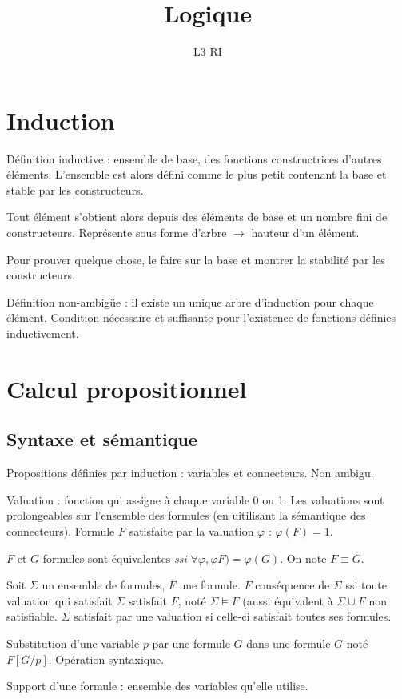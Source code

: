 \documentclass[french]{article}
\title{Logique}
\date{}
\author{L3 RI}
\begin{document}
\maketitle
\tableofcontents
\section{Induction}
Définition inductive : ensemble de base, des fonctions constructrices d'autres éléments. L'ensemble est alors défini comme le plus petit contenant la base et stable par les constructeurs.

Tout élément s'obtient alors depuis des éléments de base et un nombre fini de constructeurs. Représente sous forme d'arbre $\rightarrow$ hauteur d'un élément.

Pour prouver quelque chose, le faire sur la base et montrer la stabilité par les constructeurs.

Définition non-ambigüe : il existe un unique arbre d'induction pour chaque élément. Condition nécessaire et suffisante pour l'existence de fonctions définies inductivement.

\section{Calcul propositionnel}
\subsection{Syntaxe et sémantique}
Propositions définies par induction : variables et connecteurs. Non ambigu.

Valuation : fonction qui assigne à chaque variable 0 ou 1.
Les valuations sont prolongeables sur l'ensemble des formules (en uitilisant la sémantique des connecteurs). Formule $F$ satisfaite par la valuation $\varphi$ : $\varphi (F) = 1$.

$F$ et $G$ formules sont équivalentes \emph{ssi} $\forall\varphi ,\varphi F) = \varphi (G)$. On note $F\equiv G$. 

Soit $\Sigma$ un ensemble de formules, $F$ une formule. $F$ conséquence de $\Sigma$ ssi toute valuation qui satisfait $\Sigma$ satisfait $F$, noté $\Sigma\models F$ (aussi équivalent à $\Sigma\cup F$ non satisfiable. $\Sigma$ satisfait par une valuation si celle-ci satisfait toutes ses formules.

Substitution d'une variable $p$ par une formule $G$ dans une formule $G$ noté $F[G/p]$. Opération syntaxique.

Support d'une formule : ensemble des variables qu'elle utilise.
\end{document}
